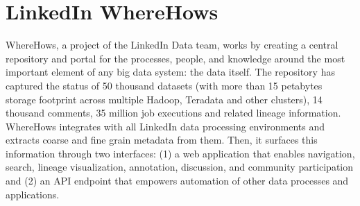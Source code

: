 \section{LinkedIn WhereHows}

WhereHows, a project of the LinkedIn Data team, works by creating a central repository and portal for the processes, people, and knowledge around the most important element of any big data system: the data itself. The repository has captured the status of 50 thousand datasets (with more than 15 petabytes storage footprint across multiple Hadoop, Teradata and other clusters), 14 thousand comments, 35 million job executions and related lineage information.\cite{ wherehows-web} WhereHows integrates with all LinkedIn data processing environments and extracts coarse and fine grain metadata from them. Then, it surfaces this information through two interfaces: (1) a web application that enables navigation, search, lineage visualization, annotation, discussion, and community participation and (2) an API endpoint that empowers automation of other data processes and applications.\cite{wherehows-wiki}
 
 

